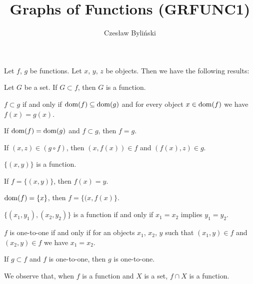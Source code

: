 \documentclass{article}
\title{Graphs of Functions (GRFUNC1)}
\author{Czes{\l}aw Byli\'nski}
\begin{document}
\maketitle

Let $f$, $g$ be functions. Let $x$, $y$, $z$ be objects. Then we have
the following results:
\begin{thm}
\item\label{grfunc1:1} Let $G$ be a set. If $G\subset f$, then $G$ is a function.
\item\label{grfunc1:2} $f\subset g$ if and only if
  $\operatorname{dom}(f)\subseteq\operatorname{dom}(g)$ and for every object $x\in\operatorname{dom}(f)$ we have $f(x)=g(x)$.
\item\label{grfunc1:3} If $\operatorname{dom}(f)=\operatorname{dom}(g)$ and $f\subset g$, then $f=g$.
\item\label{grfunc1:4} If $(x,z)\in(g\circ f)$, then $(x,f(x))\in f$ and
  $(f(x),z)\in g$.
\item\label{grfunc1:5} $\{(x,y)\}$ is a function.
\item\label{grfunc1:6} If $f=\{(x,y)\}$, then $f(x)=y$.
\item\label{grfunc1:7} $\operatorname{dom}(f)=\{x\}$, then $f=\{(x,f(x)\}$.
\item\label{grfunc1:8} $\{(x_{1},y_{1}),(x_{2},y_{2})\}$ is a function
  if and only if $x_{1}=x_{2}$ implies $y_{1}=y_{2}$.
\item\label{grfunc1:9} $f$ is one-to-one if and only if for an objects
  $x_{1}$, $x_{2}$, $y$ such that $(x_{1},y)\in f$ and $(x_{2},y)\in f$
  we have $x_{1}=x_{2}$.
\item\label{grfunc1:10} If $g\subset f$ and $f$ is one-to-one, then $g$
  is one-to-one.
\end{thm}

We observe that, when $f$ is a function and $X$ is a set, $f\cap X$ is a function.
\end{document}
